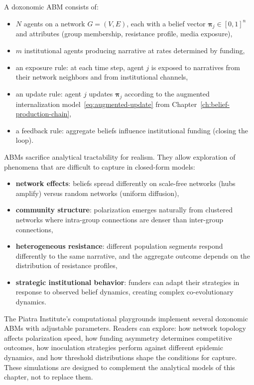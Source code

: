 \begin{model}
\label{mod:abm}
A doxonomic ABM consists of:
\begin{itemize}[nosep]
  \item $N$ agents on a network $G = (V, E)$, each with a belief vector $\bm{\pi}_j \in [0,1]^n$ and attributes (group membership, resistance profile, media exposure),
  \item $m$ institutional agents producing narrative at rates determined by funding,
  \item an exposure rule: at each time step, agent $j$ is exposed to narratives from their network neighbors and from institutional channels,
  \item an update rule: agent $j$ updates $\bm{\pi}_j$ according to the augmented internalization model~\eqref{eq:augmented-update} from Chapter~\ref{ch:belief-production-chain},
  \item a feedback rule: aggregate beliefs influence institutional funding (closing the loop).
\end{itemize}
\end{model}

ABMs sacrifice analytical tractability for realism.
They allow exploration of phenomena that are difficult to capture in closed-form models:
\begin{itemize}[nosep]
  \item \textbf{network effects}: beliefs spread differently on scale-free networks (hubs amplify) versus random networks (uniform diffusion),
  \item \textbf{community structure}: polarization emerges naturally from clustered networks where intra-group connections are denser than inter-group connections,
  \item \textbf{heterogeneous resistance}: different population segments respond differently to the same narrative, and the aggregate outcome depends on the distribution of resistance profiles,
  \item \textbf{strategic institutional behavior}: funders can adapt their strategies in response to observed belief dynamics, creating complex co-evolutionary dynamics.
\end{itemize}

\begin{remark}
\label{rem:playgrounds}
The Piatra Institute's computational playgrounds implement several doxonomic ABMs with adjustable parameters.
Readers can explore: how network topology affects polarization speed, how funding asymmetry determines competitive outcomes, how inoculation strategies perform against different epidemic dynamics, and how threshold distributions shape the conditions for capture.
These simulations are designed to complement the analytical models of this chapter, not to replace them.
\end{remark}


